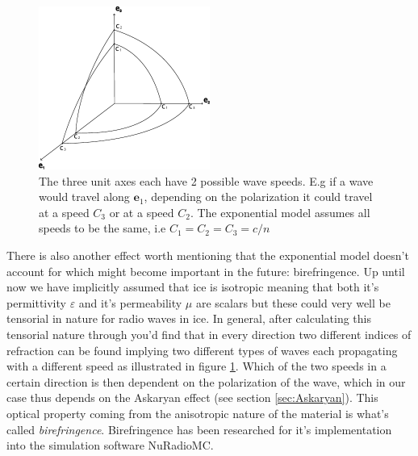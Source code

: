 \begin{figure}
  \centering
  \includegraphics[width=0.5\textwidth]{figures/Fresnel.pdf}
  \caption{The three unit axes each have 2 possible wave speeds. E.g if a wave would
  travel along $\mathbf{e}_1$, depending on the polarization it could travel at a speed $C_3$ or
  at a speed $C_2$. The exponential model assumes all speeds to be the same, i.e $C_1=C_2=C_3=c/n$}
  \label{fig:Fresnel}
\end{figure}

There is also another effect worth mentioning that the exponential model
doesn't account for which might become important in the future: birefringence.
Up until now we have implicitly assumed that ice is isotropic meaning that both
it's permittivity $\varepsilon$ and it's permeability $\mu$ are scalars but
these could very well be tensorial in nature for radio waves in ice. In
general, after calculating this tensorial nature through you'd find that in
every direction two different indices of refraction can be found implying two
different types of waves each propagating with a different speed as illustrated
in figure \ref{fig:Fresnel}.  Which of the two speeds in a certain direction is
then dependent on the polarization of the wave, which in our case thus depends
on the Askaryan effect (see section \ref{sec:Askaryan}).  This optical property
coming from the anisotropic nature of the material is what's called
\textit{birefringence}.  Birefringence has been researched for it's
implementation into the simulation software NuRadioMC\cite{Heyer2023}.

